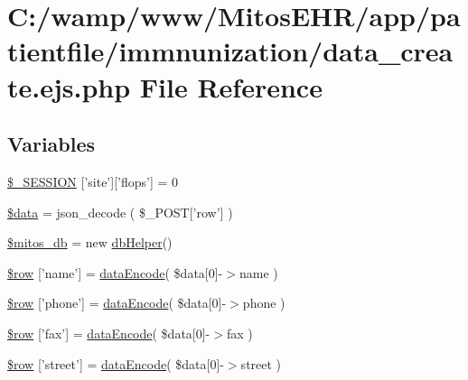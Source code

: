 \hypertarget{patientfile_2immnunization_2data__create_8ejs_8php}{\section{\-C\-:/wamp/www/\-Mitos\-E\-H\-R/app/patientfile/immnunization/data\-\_\-create.ejs.\-php \-File \-Reference}
\label{patientfile_2immnunization_2data__create_8ejs_8php}
}
\subsection*{\-Variables}
\begin{DoxyCompactItemize}
\item 
\hyperlink{patientfile_2immnunization_2data__create_8ejs_8php_a99fda8552a3e58235643b79f5af3ded8}{\$\-\_\-\-S\-E\-S\-S\-I\-O\-N} \mbox{[}'site'\mbox{]}\mbox{[}'flops'\mbox{]} = 0
\item 
\hyperlink{patientfile_2immnunization_2data__create_8ejs_8php_a6efc15b5a2314dd4b5aaa556a375c6d6}{\$data} = json\-\_\-decode ( \$\-\_\-\-P\-O\-S\-T\mbox{[}'row'\mbox{]} )
\item 
\hyperlink{patientfile_2immnunization_2data__create_8ejs_8php_ab5d961f93efe4e2e8d8374f01dd6c65a}{\$mitos\-\_\-db} = new \hyperlink{classdb_helper}{db\-Helper}()
\item 
\hyperlink{patientfile_2immnunization_2data__create_8ejs_8php_a63a1136a683bf9c4637010f73791443a}{\$row} \mbox{[}'name'\mbox{]} = \hyperlink{data_exchange_8class_8php_a18220e6e744fcb46d788ed8b03b85f62}{data\-Encode}( \$data\mbox{[}0\mbox{]}-\/$>$name )
\item 
\hyperlink{patientfile_2immnunization_2data__create_8ejs_8php_a9eb773d64ffa16faf1e29ccbaf4f065c}{\$row} \mbox{[}'phone'\mbox{]} = \hyperlink{data_exchange_8class_8php_a18220e6e744fcb46d788ed8b03b85f62}{data\-Encode}( \$data\mbox{[}0\mbox{]}-\/$>$phone )
\item 
\hyperlink{patientfile_2immnunization_2data__create_8ejs_8php_addcf6434ea14720a2fb19d21dc55a8c9}{\$row} \mbox{[}'fax'\mbox{]} = \hyperlink{data_exchange_8class_8php_a18220e6e744fcb46d788ed8b03b85f62}{data\-Encode}( \$data\mbox{[}0\mbox{]}-\/$>$fax )
\item 
\hyperlink{patientfile_2immnunization_2data__create_8ejs_8php_a7333deeacbe82dc6e01b7e9e86eb3e5a}{\$row} \mbox{[}'street'\mbox{]} = \hyperlink{data_exchange_8class_8php_a18220e6e744fcb46d788ed8b03b85f62}{data\-Encode}( \$data\mbox{[}0\mbox{]}-\/$>$street )

\end{DoxyCompactItemize}
